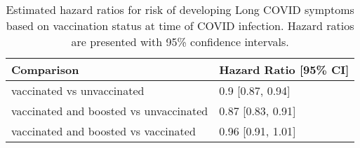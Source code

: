 \begin{table}[!htbp]
\centering
\begin{tabular}{ll}
  \hline
Comparison & Hazard Ratio [95\% CI] \\ 
  \hline
vaccinated vs unvaccinated & 0.9 [0.87, 0.94] \\ 
  vaccinated and boosted vs unvaccinated & 0.87 [0.83, 0.91] \\ 
  vaccinated and boosted vs vaccinated & 0.96 [0.91, 1.01] \\ 
   \hline
\end{tabular}
\caption{Estimated hazard ratios for risk of developing Long COVID symptoms based on vaccination status at time of COVID infection. Hazard ratios are presented with 95\% confidence intervals.} 
\label{tab:cox_simple_emm_pairs}
\end{table}
